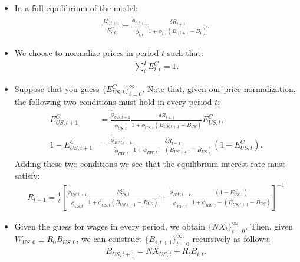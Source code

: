 \documentclass{article}
\begin{document}
\begin{itemize}
    \item In a full equilibrium of the model:
    \begin{align}
        \frac{E_{i,t+1}^{C}}{E_{i,t}^{C}} = \frac{\widetilde{\phi}_{i,t+1}}{\widetilde{\phi}_{i,t}} \frac{\delta R_{t+1}}{1+\phi_{i,t} (B_{i,t+1} - \bar{B}_{i})}.
        \label{eq:EEbonds}
    \end{align}

    \item We choose to normalize prices in period $t$ such that:
    \begin{align*}
        \sum_{i}^{I} E_{i,t}^{C} = 1.
    \end{align*}

    \item Suppose that you guess $\{ E_{US,t}^{C} \}_{t=0}^{\infty}$. Note that, given our price normalization, the following two conditions must hold in every period $t$:
    \begin{align*}
        E_{US,t+1}^{C} & = \frac{\widetilde{\phi}_{US,t+1}}{\widetilde{\phi}_{US,t}} \frac{\delta R_{t+1}}{1+\phi_{US,t} (B_{US,t+1} - \bar{B}_{US})} E_{US,t}^{C}, \\
        1 - E_{US,t+1}^{C} & = \frac{\widetilde{\phi}_{RW,t+1}}{\widetilde{\phi}_{RW,t}} \frac{\delta R_{t+1}}{1+\phi_{RW,t} -(B_{US,t+1} - \bar{B}_{US})} \left( 1 - E_{US,t}^{C} \right).
    \end{align*}
    Adding these two conditions we see that the equilibrium interest rate must satisfy:
    \begin{align}
        R_{t+1} = \frac{1}{\delta} \left[ \frac{\widetilde{\phi}_{US,t+1}}{\widetilde{\phi}_{US,t}} \frac{E_{US,t}^{C}}{1+\phi_{US,t} (B_{US,t+1} - \bar{B}_{US})}  + \frac{\widetilde{\phi}_{RW,t+1}}{\widetilde{\phi}_{RW,t}} \frac{\left( 1 - E_{US,t}^{C} \right)}{1+\phi_{RW,t} -(B_{US,t+1} - \bar{B}_{US})}  \right]^{-1}
    \end{align}

    \item Given the guess for wages in every period, we obtain $\{ NX_{t}\}_{t=0}^{\infty}$. Then, given $W_{US,0} \equiv R_{0} B_{US,0}$, we can construct $\{ B_{i,t+1} \}_{t=0}^{\infty}$ recursively as follows:
    \begin{align}
        B_{US,t+1} = NX_{US,t} + R_{t} B_{i,t}.
    \end{align}


\end{itemize}
\end{document}

